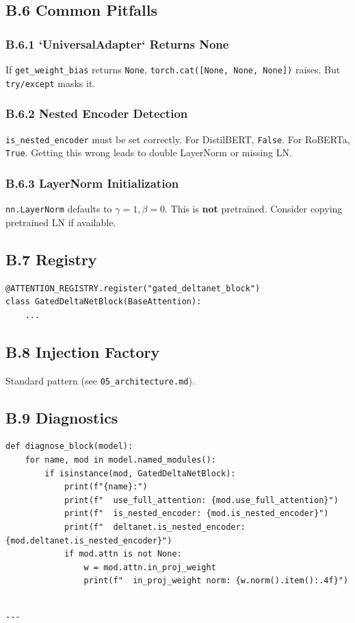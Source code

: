 \subsection{B.6 Common Pitfalls}

\subsubsection{B.6.1 `UniversalAdapter` Returns None}

If \texttt{get\_weight\_bias} returns \texttt{None}, \texttt{torch.cat([None, None, None])} raises. 
But \texttt{try/except} masks it.

\subsubsection{B.6.2 Nested Encoder Detection}

\texttt{is\_nested\_encoder} must be set correctly. For DistilBERT, \texttt{False}. For 
RoBERTa, \texttt{True}. Getting this wrong leads to double LayerNorm or missing LN.

\subsubsection{B.6.3 LayerNorm Initialization}

\texttt{nn.LayerNorm} defaults to $\gamma = 1, \beta = 0$. This is \textbf{not} 
pretrained. Consider copying pretrained LN if available.

\subsection{B.7 Registry}

\begin{lstlisting}
@ATTENTION_REGISTRY.register("gated_deltanet_block")
class GatedDeltaNetBlock(BaseAttention):
    ...
\end{lstlisting}

\subsection{B.8 Injection Factory}

Standard pattern (see \texttt{05\_architecture.md}).

\subsection{B.9 Diagnostics}

\begin{lstlisting}
def diagnose_block(model):
    for name, mod in model.named_modules():
        if isinstance(mod, GatedDeltaNetBlock):
            print(f"{name}:")
            print(f"  use_full_attention: {mod.use_full_attention}")
            print(f"  is_nested_encoder: {mod.is_nested_encoder}")
            print(f"  deltanet.is_nested_encoder: {mod.deltanet.is_nested_encoder}")
            if mod.attn is not None:
                w = mod.attn.in_proj_weight
                print(f"  in_proj_weight norm: {w.norm().item():.4f}")
\end{lstlisting}
\begin{lstlisting}

---
\end{lstlisting}